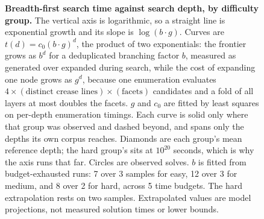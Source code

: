 \begin{figure}[t]
\caption{\textbf{Breadth-first search time against search depth, by difficulty group.}
The vertical axis is logarithmic, so a straight line is exponential growth and its slope is
$\log(b\cdot g)$. Curves are $t(d)=c_0(b\cdot g)^d$, the product of two exponentials: the
frontier grows as $b^d$ for a deduplicated branching factor $b$, measured as generated over
expanded during search, while the cost of expanding one node grows as $g^d$, because one
enumeration evaluates $4\times(\text{distinct crease lines})\times(\text{facets})$ candidates
and a fold of all layers at most doubles the facets. $g$ and $c_0$ are fitted by least squares
on per-depth enumeration timings. Each curve is solid only where that group was observed and
dashed beyond, and spans only the depths its own corpus reaches. Diamonds are each group's
mean reference depth; the hard group's sits at $10^{20}$ seconds, which is why the axis runs
that far. Circles are observed solves. $b$ is fitted from budget-exhausted runs: 7 over 3
samples for easy, 12 over 3 for medium, and 8 over 2 for hard, across 5 time budgets. The
hard extrapolation rests on two samples. Extrapolated values are model projections,
not measured solution times or lower bounds.}
\label{fig:depth-wall}
\end{figure}
